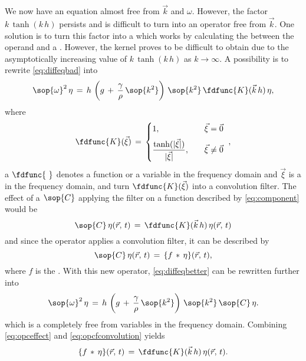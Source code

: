 We now have an equation almost free from $\vec{k}$ and $\omega$. However, the factor $k\,\tanh(k\,h)$ persists and is difficult to turn into an operator free from $\vec{k}$. One solution is to turn this factor into a  which works by calculating the  between the operand and a . However, the kernel proves to be difficult to obtain due to the asymptotically increasing value of $k\,\tanh(k\,h)$ as $k\rightarrow\infty$. A possibility is to rewrite \eqref{eq:diffeqbad} into
%
\begin{equation} \label{eq:diffeqbetter}
\sop{\omega}^2\,\eta \,=\, h\,\left(g\,+\,\frac{\gamma}{\rho}\,\sop{k^2}\right)\,\sop{k^2}\,\fdfunc{K}(\vec{k}\,h)\,\eta,
\end{equation}
%
where
%
\begin{equation} \label{eq:transkernelofxivec}
\fdfunc{K}(\vec{\xi}) \,=\, \begin{cases}
1                                                  , & \quad \vec{\xi} = \vec{0} \\[.5em]
\displaystyle\frac{\tanh(|\vec{\xi}|)}{|\vec{\xi}|}, & \quad \vec{\xi} \neq \vec{0}
\end{cases}\ ,
\end{equation}
%
a $\fdfunc{\ }$ denotes a function or a variable in the frequency domain and $\vec{\xi}$ is a  in the frequency domain, and turn $\fdfunc{K}(\vec{\xi})$ into a convolution filter. The effect of a  $\sop{C}$ applying the filter on a function described by \eqref{eq:component} would be
%
\begin{equation} \label{eq:opceffect}
\sop{C}\,\eta(\vec{r},\,t) \,=\, \fdfunc{K}(\vec{k}\,h)\,\eta(\vec{r},\,t)
\end{equation}
%
and since the operator applies a convolution filter, it can be described by
%
\begin{equation} \label{eq:opcfconvolution}
\sop{C}\,\eta(\vec{r},\,t) \,=\, \{f\,*\,\eta\}(\vec{r},\,t),
\end{equation}
%
where $f$ is the . With this new operator, \eqref{eq:diffeqbetter} can be rewritten further into
%
\begin{equation} \label{eq:diffeqspatial}
\sop{\omega}^2\,\eta \,=\, h\,\left(g\,+\,\frac{\gamma}{\rho}\,\sop{k^2}\right)\,\sop{k^2}\,\sop{C}\,\eta.
\end{equation}
%
which is a \PDE completely free from variables in the frequency domain. Combining \eqref{eq:opceffect} and \eqref{eq:opcfconvolution} yields
%
\begin{equation} \label{eq:fconvolutioneffect}
\{f\,*\,\eta\}(\vec{r},\,t) \,=\, \fdfunc{K}(\vec{k}\,h)\,\eta(\vec{r},\,t).
\end{equation}

